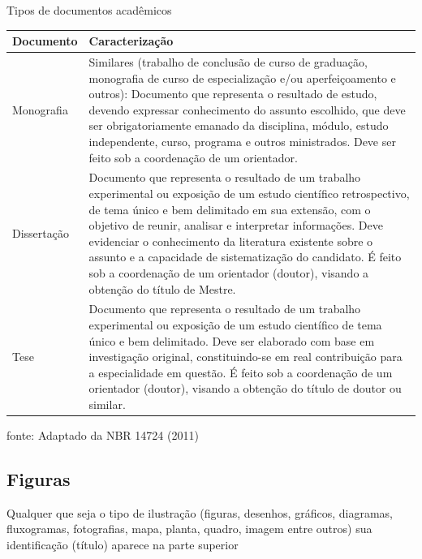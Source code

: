 \documentclass[
  12pt,		%
  a4paper,	%
  openright,%
  oneside,	%
  chapter=TITLE,		%
  section=TITLE,		%
  english,	%
  french,	%
  spanish,	%
  brazil
]{abntex2}
\begin{document}
                \begin{quadro}[h]
                    \centering
                    \caption{Tipos de documentos acadêmicos}
                    \label{quadroUm}
                    \begin{tabular}{|l|p{12cm}|}
                    \hline
                    Documento & Caracterização \\ \hline
                    Monografia  & Similares (trabalho de conclusão de curso de graduação, monografia de curso de especialização e/ou aperfeiçoamento e outros): Documento que representa o resultado de estudo, devendo expressar conhecimento do assunto escolhido, que deve ser obrigatoriamente emanado da disciplina, módulo, estudo independente, curso, programa e outros ministrados. Deve ser feito sob a coordenação de um orientador. \\ \hline
                    Dissertação & Documento que representa o resultado de um trabalho experimental ou exposição de um estudo científico retrospectivo, de tema único e bem delimitado em sua extensão, com o objetivo de reunir, analisar e interpretar informações. Deve evidenciar o conhecimento da literatura existente sobre o assunto e a capacidade de sistematização do candidato. É feito sob a coordenação de um orientador (doutor), visando a obtenção do título de Mestre. \\ \hline
                    Tese & Documento que representa o resultado de um trabalho experimental ou exposição de um estudo científico de tema único e bem delimitado. Deve ser elaborado com base em investigação original, constituindo-se em real contribuição para a especialidade em questão. É feito sob a coordenação de um orientador (doutor), visando a obtenção do título de doutor ou similar. \\ \hline
                    \end{tabular}
                    \par
                    {\small fonte: Adaptado da NBR 14724 (2011)}
                \end{quadro}

            \subsection {Figuras}
            
                Qualquer que seja o tipo de ilustração (figuras, desenhos, gráficos, diagramas, fluxogramas, fotografias, mapa, planta, quadro, imagem entre outros) sua identificação (título) aparece na parte superior
                
\end{document}
